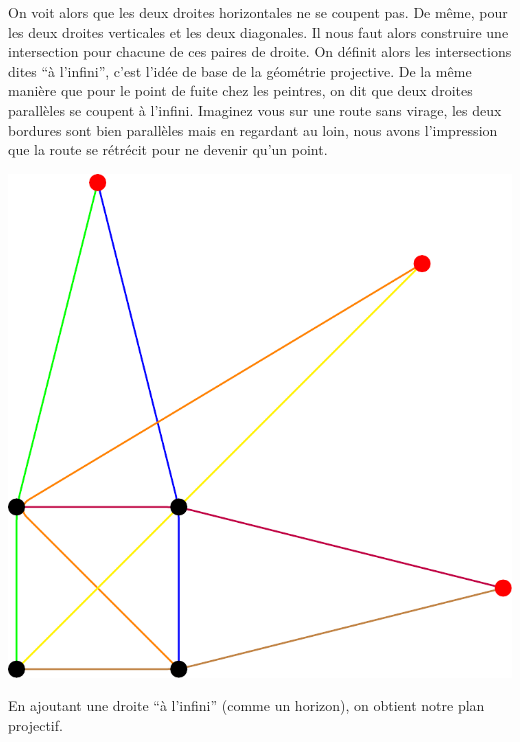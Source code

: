 \documentclass[a4paper]{article}
\begin{document}
On voit alors que les deux droites horizontales ne se coupent pas. De même, pour les deux droites verticales et les deux diagonales. Il nous faut alors construire une intersection pour chacune de ces paires de droite. On définit alors les intersections dites ``à l'infini'', c'est l'idée de base de la géométrie projective. De la même manière que pour le point de fuite chez les peintres, on dit que deux droites parallèles se coupent à l'infini. Imaginez vous sur une route sans virage, les deux bordures sont bien parallèles mais en regardant au loin, nous avons l'impression que la route se rétrécit pour ne devenir qu'un point.\\
\begin{center}
\includegraphics[scale=0.5]{planproj2.pdf}
\end{center}
\newpage
En ajoutant une droite ``à l'infini'' (comme un horizon), on obtient notre plan projectif.
\end{document}

